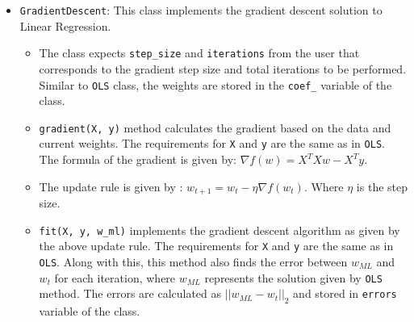 \documentclass[a4paper]{article}
\begin{document}
\begin{itemize}
\begin{itemize}
        \item The weights are calculated and stored in the \verb|coef_| variable of the class. The last entry in \verb|coef_| is the intercept value. The formula to calculate the weights is given by:  \begin{center}
            $w_{ML} = (X^T X)^{-1} X^T y$. 
        \end{center}
     
        \item \verb|predict(X)| method calculates the predictions for data stored in \verb|X|. \verb|X| is the data matrix that has data points as rows and features as columns, expected to be a \verb|numpy ndarray| or a \verb|pandas dataframe|.
        
        \item The predictions are calculated by the formula: $Xw_{ML}$
    \end{itemize}

    \item \verb|GradientDescent|: This class implements the gradient descent solution to Linear Regression.
    \begin{itemize}
        \item The class expects \verb|step_size| and \verb|iterations| from the user that corresponds to the gradient step size and total iterations to be performed. Similar to \verb|OLS| class, the weights are stored in the \verb|coef_| variable of the class.
    
        \item \verb|gradient(X, y)| method calculates the gradient based on the data and current weights. The requirements for \verb|X| and \verb|y| are the same as in \verb|OLS|. The formula of the gradient is given by: $\nabla f(w)=X^T Xw - X^T y$.
        
        \item The update rule is given by : $w_{t+1}=w_t - \eta \nabla f(w_t)$. Where $\eta$ is the step size.
        
        \item \verb|fit(X, y, w_ml)| implements the gradient descent algorithm as given by the above update rule. The requirements for \verb|X| and \verb|y| are the same as in \verb|OLS|. Along with this, this method also finds the error between $w_{ML}$ and $w_t$ for each iteration, where $w_{ML}$ represents the solution given by \verb|OLS| method. The errors are calculated as $||w_{ML}-w_t||_2$ and stored in \verb|errors| variable of the class.
        

\end{itemize}
\end{itemize}
\end{document}
